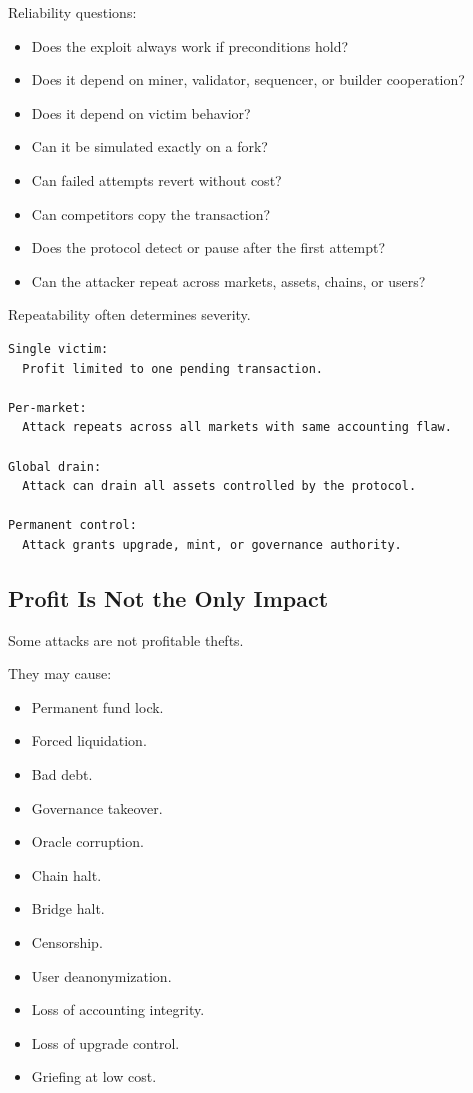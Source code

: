 Reliability questions:

\begin{itemize}
\tightlist
\item
  Does the exploit always work if preconditions hold?
\item
  Does it depend on miner, validator, sequencer, or builder cooperation?
\item
  Does it depend on victim behavior?
\item
  Can it be simulated exactly on a fork?
\item
  Can failed attempts revert without cost?
\item
  Can competitors copy the transaction?
\item
  Does the protocol detect or pause after the first attempt?
\item
  Can the attacker repeat across markets, assets, chains, or users?
\end{itemize}

Repeatability often determines severity.

\begin{lstlisting}
Single victim:
  Profit limited to one pending transaction.

Per-market:
  Attack repeats across all markets with same accounting flaw.

Global drain:
  Attack can drain all assets controlled by the protocol.

Permanent control:
  Attack grants upgrade, mint, or governance authority.
\end{lstlisting}

\subsection{Profit Is Not the Only Impact}

Some attacks are not profitable thefts.

They may cause:

\begin{itemize}
\tightlist
\item
  Permanent fund lock.
\item
  Forced liquidation.
\item
  Bad debt.
\item
  Governance takeover.
\item
  Oracle corruption.
\item
  Chain halt.
\item
  Bridge halt.
\item
  Censorship.
\item
  User deanonymization.
\item
  Loss of accounting integrity.
\item
  Loss of upgrade control.
\item
  Griefing at low cost.
\end{itemize}


